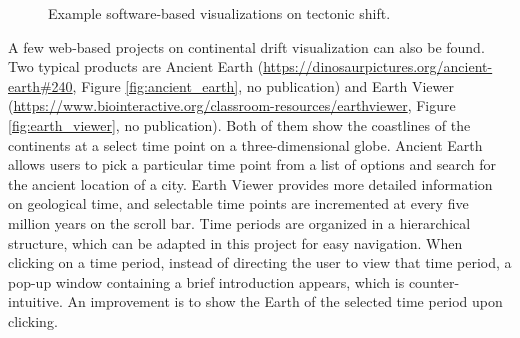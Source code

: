 \documentclass[11pt, a4paper,oneside,chapterprefix=false]{scrbook}
\begin{document}
\newpage
\begin{figure}[h]
	\centering
	\hfill
	\caption{Example software-based visualizations on tectonic shift. }
	\label{fig:software_tectonic}
\end{figure}

A few web-based projects on continental drift visualization can also be found. Two typical products are Ancient Earth (\url{https://dinosaurpictures.org/ancient-earth#240}, Figure \ref{fig:ancient_earth}, no publication) and Earth Viewer (\url{https://www.biointeractive.org/classroom-resources/earthviewer}, Figure \ref{fig:earth_viewer}, no publication). Both of them show the coastlines of the continents at a select time point on a three-dimensional globe. Ancient Earth allows users to pick a particular time point from a list of options and search for the ancient location of a city. Earth Viewer provides more detailed information on geological time, and selectable time points are incremented at every five million years on the scroll bar. Time periods are organized in a hierarchical structure, which can be adapted in this project for easy navigation. When clicking on a time period, instead of directing the user to view that time period, a pop-up window containing a brief introduction appears, which is counter-intuitive. An improvement is to show the Earth of the selected time period upon clicking. \\
\end{document}
